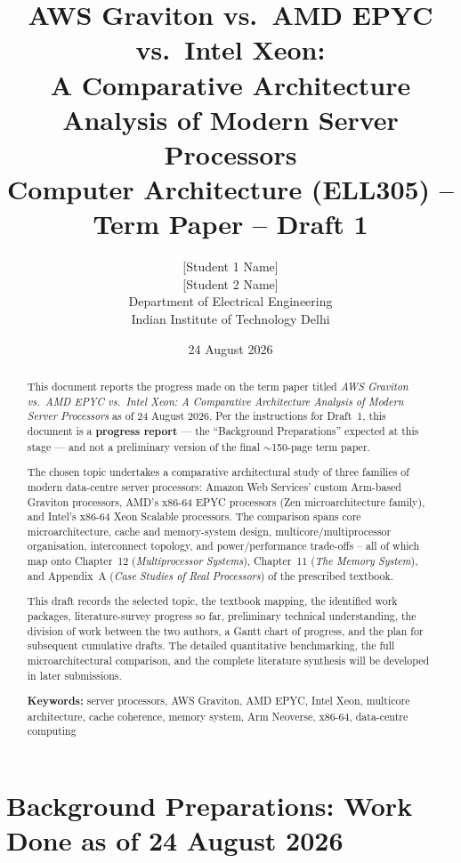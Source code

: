 \documentclass[11pt,a4paper]{article}
\title{\textbf{AWS Graviton vs.\ AMD EPYC vs.\ Intel Xeon:\\
A Comparative Architecture Analysis of Modern Server Processors}\\[4pt]
\large Computer Architecture (ELL305) -- Term Paper -- Draft 1}
\author{{[}Student 1 Name{]} \\ {[}Student 2 Name{]} \\[4pt]
\small Department of Electrical Engineering \\
\small Indian Institute of Technology Delhi}
\date{24 August 2026}
\begin{document}
\maketitle

\begin{abstract}
\noindent
This document reports the progress made on the term paper titled \emph{AWS Graviton vs.\ AMD
EPYC vs.\ Intel Xeon: A Comparative Architecture Analysis of Modern Server Processors} as of
24 August 2026. Per the instructions for Draft~1, this document is a \textbf{progress report}
--- the ``Background Preparations'' expected at this stage --- and not a preliminary version of
the final $\sim$150-page term paper.

The chosen topic undertakes a comparative architectural study of three families of modern
data-centre server processors: Amazon Web Services' custom Arm-based Graviton processors,
AMD's x86-64 EPYC processors (Zen microarchitecture family), and Intel's x86-64 Xeon Scalable
processors. The comparison spans core microarchitecture, cache and memory-system design,
multicore/multiprocessor organisation, interconnect topology, and power/performance
trade-offs -- all of which map onto Chapter~12 (\emph{Multiprocessor Systems}), Chapter~11
(\emph{The Memory System}), and Appendix~A (\emph{Case Studies of Real Processors}) of the
prescribed textbook.

This draft records the selected topic, the textbook mapping, the identified work packages,
literature-survey progress so far, preliminary technical understanding, the division of work
between the two authors, a Gantt chart of progress, and the plan for subsequent cumulative
drafts. The detailed quantitative benchmarking, the full microarchitectural comparison, and the
complete literature synthesis will be developed in later submissions.

\vspace{4pt}
\noindent\textbf{Keywords:} server processors, AWS Graviton, AMD EPYC, Intel Xeon, multicore
architecture, cache coherence, memory system, Arm Neoverse, x86-64, data-centre computing
\end{abstract}

\tableofcontents
\newpage

\section{Background Preparations: Work Done as of 24 August 2026}
\end{document}
